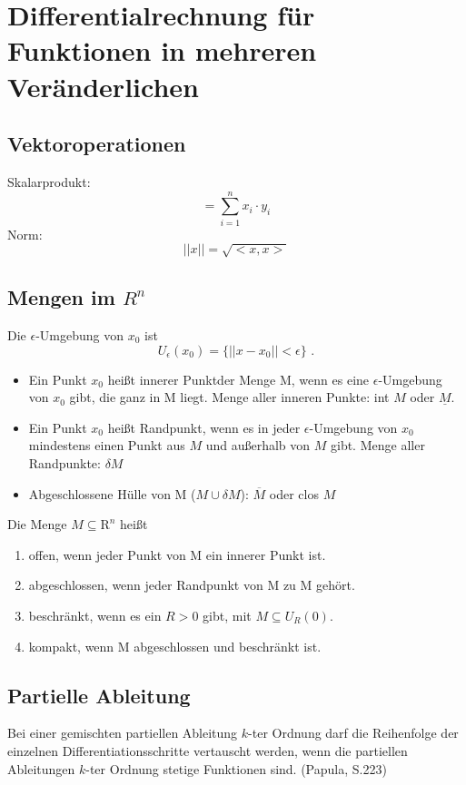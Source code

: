 \documentclass[12pt,a4paper]{article}
\begin{document}
\section{Differentialrechnung für Funktionen in mehreren Veränderlichen}
\subsection{Vektoroperationen}
Skalarprodukt:
\[<x,y> = \sum\limits_{i=1}^{n}{x_i \cdot y_i}\]
Norm:
\[\left|| x \right|| = \sqrt{<x,x>} \]

\subsection{Mengen im $R^n$}
Die $\epsilon$-Umgebung von $x_0$ ist
\[U_\epsilon (x_0) = \{\left|| x- x_0 \right|| < \epsilon \}\text{ .}\]
\begin{itemize}
\item
Ein Punkt $x_0$ heißt \glqq innerer Punkt\grqq der Menge M, wenn es eine $\epsilon$-Umgebung von $x_0$ gibt, die ganz in M liegt. Menge aller inneren Punkte: int $M$ oder $\underline{M}$.

\item
Ein Punkt $x_0$ heißt Randpunkt, wenn es in jeder $\epsilon$-Umgebung von $x_0$ mindestens einen Punkt aus $M$ und außerhalb von $M$ gibt. Menge aller Randpunkte: $\delta M$

\item
Abgeschlossene Hülle von M ($M  \cup \delta M$): $\overline{M}$ oder clos $M$

\end{itemize}
Die Menge $M \subseteq \mathrm{R}^n$ heißt
\begin{enumerate}
\item
offen, wenn jeder Punkt von M ein innerer Punkt ist.
\item
abgeschlossen, wenn jeder Randpunkt von M zu M gehört.
\item
beschränkt, wenn es ein $R>0$ gibt, mit $M \subseteq U_R(0)$.
\item
kompakt, wenn M abgeschlossen und beschränkt ist.
\end{enumerate}
\subsection{Partielle Ableitung}
Bei einer gemischten partiellen Ableitung $k$-ter Ordnung darf die Reihenfolge der einzelnen Differentiationsschritte vertauscht werden, wenn die partiellen Ableitungen $k$-ter Ordnung stetige Funktionen sind. (Papula, S.223)
\end{document}
